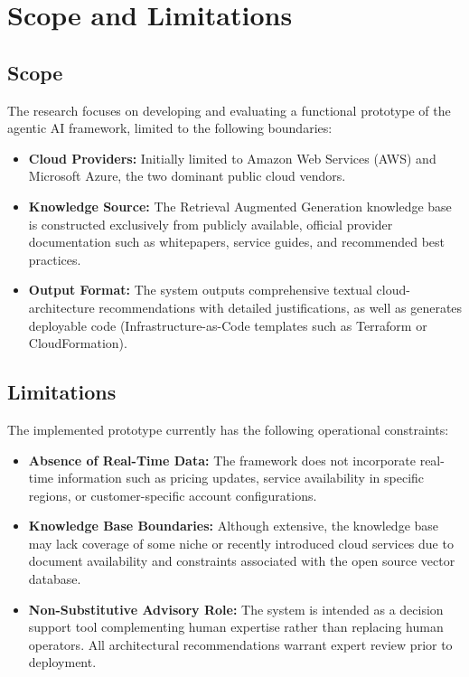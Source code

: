 \section{Scope and Limitations}

\subsection{Scope}

The research focuses on developing and evaluating a functional prototype of the agentic AI framework, limited to the following boundaries:

\begin{itemize}
    \item \textbf{Cloud Providers:} Initially limited to Amazon Web Services (AWS) and Microsoft Azure, the two dominant public cloud vendors.
    \item \textbf{Knowledge Source:} The Retrieval Augmented Generation knowledge base is constructed exclusively from publicly available, official provider documentation such as whitepapers, service guides, and recommended best practices.
    \item \textbf{Output Format:} The system outputs comprehensive textual cloud-architecture recommendations with detailed justifications, as well as generates deployable code (Infrastructure-as-Code templates such as Terraform or CloudFormation).
\end{itemize}

\subsection{Limitations}

The implemented prototype currently has the following operational constraints:

\begin{itemize}
    \item \textbf{Absence of Real-Time Data:} The framework does not incorporate real-time information such as pricing updates, service availability in specific regions, or customer-specific account configurations.
    \item \textbf{Knowledge Base Boundaries:} Although extensive, the knowledge base may lack coverage of some niche or recently introduced cloud services due to document availability and constraints associated with the open source vector database.
    \item \textbf{Non-Substitutive Advisory Role:} The system is intended as a decision support tool complementing human expertise rather than replacing human operators. All architectural recommendations warrant expert review prior to deployment.
\end{itemize}

